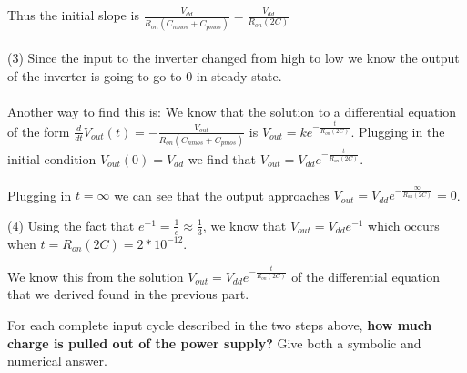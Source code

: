 \begin{enumerate}
{  Thus the initial slope is $\frac{V_{dd}}{R_{on}(C_{nmos} + C_{pmos})} = \frac{V_{dd}}{R_{on}(2C)}$
  \\
  \\
  (3) Since the input to the inverter changed from high to low we know the output of the inverter is going to go to $0$ in steady state.
  \\
  \\
  Another way to find this is: We know that the solution to a differential equation of the form $\frac{d}{dt}V_{out}(t) = - \frac{V_{out}}{R_{on}(C_{nmos} + C_{pmos})}$ is $V_{out} = ke^{-\frac{t}{R_{on}(2C)}}$.
  Plugging in the initial condition $V_{out}(0) = V_{dd}$ we find that $V_{out} = V_{dd}e^{-\frac{t}{R_{on}(2C)}}$.
  \\
  \\
  Plugging in $t = \infty$ we can see that the output approaches $V_{out} = V_{dd}e^{-\frac{\infty}{R_{on}(2C)}} = 0$.

  

  (4) Using the fact that $e^{-1} = \frac{1}{e} \approx \frac{1}{3}$, we know that $V_{out} = V_{dd}e^{-1}$ which occurs when $t = R_{on}(2C) = 2 * 10^{-12}$.

  We know this from the solution $V_{out} = V_{dd}e^{-\frac{t}{R_{on}(2C)}}$ of the differential equation that we derived found in the previous part.
}



\qitem For each complete input cycle described in the two steps above, \textbf{how much charge is pulled out of the power supply?}
Give both a symbolic and numerical answer.

\end{enumerate}
